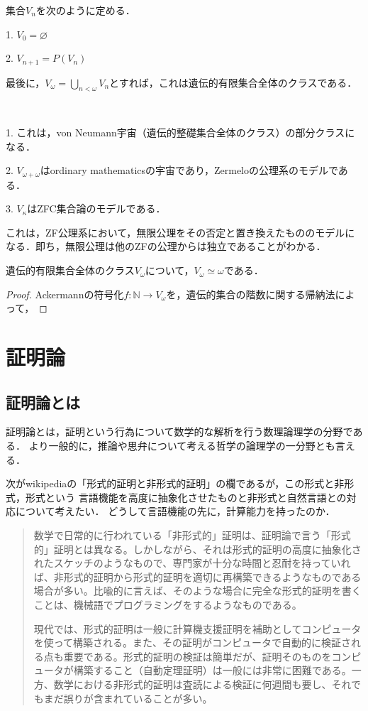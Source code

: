 \documentclass[uplatex, dvipdfmx]{jsreport}
\begin{document}
\begin{proposition}[遺伝的有限集合全体のクラス]
    集合$V_n$を次のように定める．

    1. $V_0=\varnothing$

    2. $V_{n+1}=P(V_n)$

    最後に，$V_\omega=\bigcup_{n<\omega}V_n$とすれば，これは遺伝的有限集合全体のクラスである．
\end{proposition}
\begin{remark}　

    1. これは，von Neumann宇宙（遺伝的整礎集合全体のクラス）の部分クラスになる．

    2. $V_{\omega+\omega}$はordinary mathematicsの宇宙であり，Zermeloの公理系のモデルである．

    3. $V_\kappa$はZFC集合論のモデルである．

    これは，ZF公理系において，無限公理をその否定と置き換えたもののモデルになる．即ち，無限公理は他のZFの公理からは独立であることがわかる．
\end{remark}

\begin{proposition}[Ackermann (1937)]
    遺伝的有限集合全体のクラス$V_\omega$について，$V_\omega\simeq\omega$である．
\end{proposition}
\begin{proof}
    Ackermannの符号化$f:\mathbb{N}\to V_\omega$を，遺伝的集合の階数に関する帰納法によって，
\end{proof}

\part{証明論}

\chapter*{証明論とは}

証明論とは，証明という行為について数学的な解析を行う数理論理学の分野である．
より一般的に，推論や思弁について考える哲学の論理学の一分野とも言える．

次がwikipediaの「形式的証明と非形式的証明」の欄であるが，この形式と非形式，形式という
言語機能を高度に抽象化させたものと非形式と自然言語との対応について考えたい．
どうして言語機能の先に，計算能力を持ったのか．
\begin{quotation}
    数学で日常的に行われている「非形式的」証明は、証明論で言う「形式的」証明とは異なる。しかしながら、それは形式的証明の高度に抽象化されたスケッチのようなもので、専門家が十分な時間と忍耐を持っていれば、非形式的証明から形式的証明を適切に再構築できるようなものである場合が多い。比喩的に言えば、そのような場合に完全な形式的証明を書くことは、機械語でプログラミングをするようなものである。

    現代では、形式的証明は一般に計算機支援証明を補助としてコンピュータを使って構築される。また、その証明がコンピュータで自動的に検証される点も重要である。形式的証明の検証は簡単だが、証明そのものをコンピュータが構築すること（自動定理証明）は一般には非常に困難である。一方、数学における非形式的証明は査読による検証に何週間も要し、それでもまだ誤りが含まれていることが多い。
\end{quotation}
\end{document}
